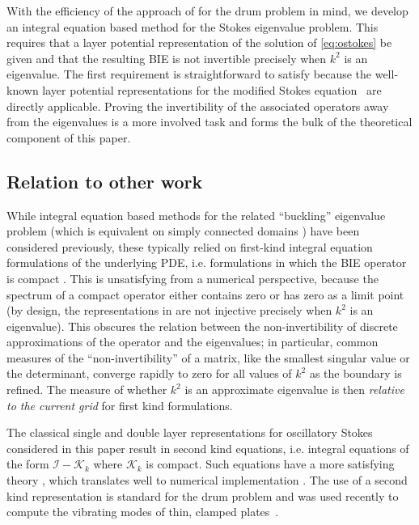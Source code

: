 With the efficiency of the approach of
\cite{zhao2015robust} for the drum problem in mind,
we develop an integral equation based method for the
Stokes eigenvalue problem.
%
This requires that a layer
potential representation of the solution
of \cref{eq:ostokes} be given and that the resulting BIE
is not invertible precisely when $k^2$ is an eigenvalue.
%
The first requirement is straightforward to
satisfy because the
well-known layer potential representations for the
modified Stokes equation~\cite{Pozrikidis1992,biros2002embedded,
  jiang2013second,ladyzhenskaya1969mathematical}
are directly applicable.
%
Proving the invertibility of the associated operators
away from the eigenvalues is a more involved task
and forms the bulk of the theoretical component
of this paper.

\subsection{Relation to other work}

While integral equation based methods for the
related ``buckling'' eigenvalue problem
(which is equivalent  on simply connected domains
\cite{kelliher2009eigenvalues})
have been considered previously,
these typically relied on first-kind integral
equation formulations of the underlying PDE,
i.e. formulations in which the BIE operator is
compact \cite{kitahara2014boundary,antunes2011buckling}.
%
This is unsatisfying from a numerical
perspective, because the spectrum of a
compact operator either contains zero
or has zero as a limit point
(by design, the representations in
\cite{kitahara2014boundary,antunes2011buckling}
are not injective precisely when
$k^2$ is an eigenvalue).
%
This obscures the relation between
the non-invertibility of discrete approximations
of the operator and the eigenvalues;
in particular, common measures of the
``non-invertibility'' of a matrix, like the
smallest singular value or the determinant,
converge rapidly to zero for all values
of $k^2$ as the boundary is refined.
The measure of whether $k^2$ is an
approximate eigenvalue is then {\em relative to the
  current grid} for first kind formulations.

The classical single and double layer representations
for oscillatory Stokes considered in this paper
result in second kind equations, i.e. integral equations
of the form $\mathcal{I} - \mathcal{K}_k$ where
$\mathcal{K}_k$ is compact.
%
Such equations have a more satisfying theory
\cite{reed1972methods,colton1983integral,kress1989linear},
which translates well to numerical implementation
\cite{atkinson2009numerical,bornemann2010numerical,
  hackbusch2012integral,zhao2015robust}.
%
The use of a second kind representation is standard
for the drum problem \cite{backer2003numerical,zhao2015robust}
and was used recently to compute the vibrating
modes of thin, clamped plates~\cite{lindsay2018boundary}.

